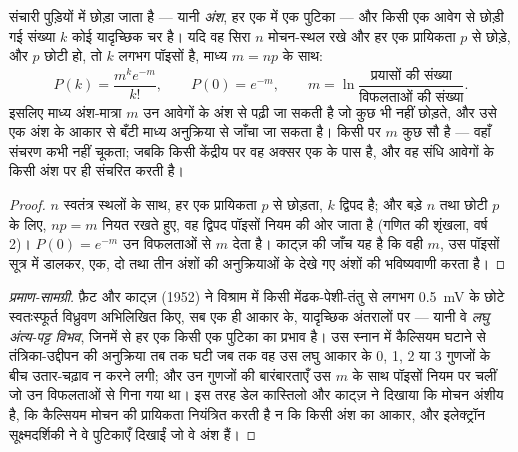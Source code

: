 \begin{theorem}[अंशीय मोचन]\label{thm:b2:neurons-synapses:quantal}
संचारी पुड़ियों में छोड़ा जाता है --- यानी \emph{अंश}, हर एक में एक पुटिका
--- और किसी एक आवेग से छोड़ी गई संख्या $k$ कोई यादृच्छिक
चर है। यदि वह सिरा $n$ मोचन-स्थल रखे और हर एक
प्रायिकता $p$ से छोड़े, और $p$ छोटी हो, तो $k$ लगभग पॉइसों है,
माध्य $m = np$ के साथ:
\[
P(k) = \frac{m^{k}e^{-m}}{k!}, \qquad P(0) = e^{-m}, \qquad
m = \ln\frac{\text{प्रयासों की संख्या}}{\text{विफलताओं की संख्या}}.
\]
इसलिए माध्य अंश-मात्रा $m$ उन आवेगों के अंश से पढ़ी जा सकती है
जो कुछ भी नहीं छोड़ते, और उसे एक अंश के आकार से बँटी
माध्य अनुक्रिया से जाँचा जा सकता है। किसी
 पर $m$ कुछ सौ है --- वहाँ संचरण कभी नहीं
चूकता; जबकि किसी केंद्रीय  पर वह अक्सर एक के पास है, और वह संधि
आवेगों के किसी अंश पर ही संचरित करती है।
\end{theorem}
\begin{proof}
$n$ स्वतंत्र स्थलों के साथ, हर एक प्रायिकता $p$ से छोड़ता, $k$
द्विपद है; और बड़े $n$ तथा छोटी $p$ के लिए, $np = m$ नियत रखते हुए, वह
द्विपद पॉइसों नियम की ओर जाता है (गणित की शृंखला, वर्ष 2)।
$P(0) = e^{-m}$ उन विफलताओं से $m$ देता है। काट्ज़ की जाँच यह है कि
वही $m$, उस पॉइसों सूत्र में डालकर, एक, दो तथा तीन अंशों की अनुक्रियाओं के
देखे गए अंशों की भविष्यवाणी करता है।
\end{proof}
\begin{proof}[प्रमाण-सामग्री]
फ़ैट और काट्ज़ (1952) ने विश्राम में किसी मेंढक-पेशी-तंतु से
लगभग \qty{0.5}{mV} के छोटे स्वतःस्फूर्त विध्रुवण अभिलिखित किए, सब
एक ही आकार के, यादृच्छिक अंतरालों पर --- यानी वे \emph{लघु अंत्य-पट्ट
विभव}, जिनमें से हर एक किसी एक पुटिका का प्रभाव है। उस स्नान में कैल्सियम
घटाने से तंत्रिका-उद्दीपन की अनुक्रिया तब तक घटी जब तक वह
उस लघु आकार के 0, 1, 2 या 3 गुणजों के बीच उतार-चढ़ाव न करने लगी;
और उन गुणजों की बारंबारताएँ उस $m$ के साथ पॉइसों नियम पर चलीं जो
उन विफलताओं से गिना गया था। इस तरह डेल कास्तिलो और काट्ज़ ने दिखाया
कि मोचन अंशीय है, कि कैल्सियम मोचन की प्रायिकता नियंत्रित करती है
न कि किसी अंश का आकार, और इलेक्ट्रॉन सूक्ष्मदर्शिकी ने
वे पुटिकाएँ दिखाईं जो वे अंश हैं।
\end{proof}

